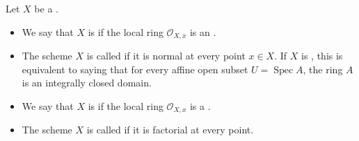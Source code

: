 \begin{definition} \label{definition:normal_and_factorial_scheme}
Let $X$ be a .
\begin{itemize}
    \item We say that $X$ is  if the local ring $\mathcal{O}_{X,x}$ is an  .

    \item The scheme $X$ is called  if it is normal at every point $x \in X$. If $X$ is , this is equivalent to saying that for every affine open subset $U = \operatorname{Spec} A$, the ring $A$ is an integrally closed domain.

    \item We say that $X$ is  if the local ring $\mathcal{O}_{X,x}$ is a .

    \item The scheme $X$ is called  if it is factorial at every point.
\end{itemize}
\end{definition}